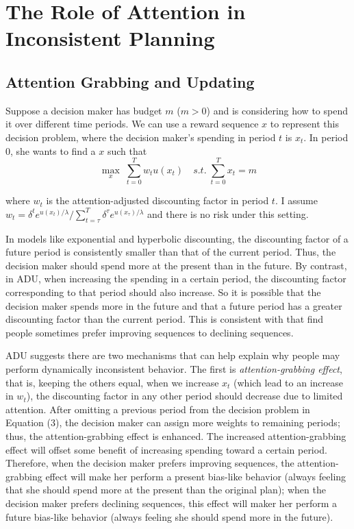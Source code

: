 \documentclass[
  12pt,
]{article}
\begin{document}
\hypertarget{the-role-of-attention-in-inconsistent-planning}{%
\section{The Role of Attention in Inconsistent
Planning}\label{the-role-of-attention-in-inconsistent-planning}}

\hypertarget{attention-grabbing-and-updating}{%
\subsection{Attention Grabbing and
Updating}\label{attention-grabbing-and-updating}}

Suppose a decision maker has budget \(m\) (\(m>0\)) and is considering
how to spend it over different time periods. We can use a reward
sequence \(x\) to represent this decision problem, where the decision
maker's spending in period \(t\) is \(x_t\). In period 0, she wants to
find a \(x\) such
that\[ \tag{3} \max_{x}\;\sum_{t=0}^T w_t u(x_t)\quad s.t. \;\sum_{t=0}^T x_t = m   \]

where \(w_t\) is the attention-adjusted discounting factor in period
\(t\). I assume
\(w_t=\delta^t e^{u(x_t)/\lambda}/\sum_{t=\tau}^T \delta^{\tau} e^{u(x_\tau)/\lambda}\)
and there is no risk under this setting.

In models like exponential and hyperbolic discounting, the discounting
factor of a future period is consistently smaller than that of the
current period. Thus, the decision maker should spend more at the
present than in the future. By contrast, in ADU, when increasing the
spending in a certain period, the discounting factor corresponding to
that period should also increase. So it is possible that the decision
maker spends more in the future and that a future period has a greater
discounting factor than the current period. This is consistent with
\citet{loewenstein_preferences_1993} that find people sometimes prefer
improving sequences to declining sequences.

ADU suggests there are two mechanisms that can help explain why people
may perform dynamically inconsistent behavior. The first is
\emph{attention-grabbing effect}, that is, keeping the others equal,
when we increase \(x_t\) (which lead to an increase in \(w_t\)), the
discounting factor in any other period should decrease due to limited
attention. After omitting a previous period from the decision problem in
Equation (3), the decision maker can assign more weights to remaining
periods; thus, the attention-grabbing effect is enhanced. The increased
attention-grabbing effect will offset some benefit of increasing
spending toward a certain period. Therefore, when the decision maker
prefers improving sequences, the attention-grabbing effect will make her
perform a present bias-like behavior (always feeling that she should
spend more at the present than the original plan); when the decision
maker prefers declining sequences, this effect will maker her perform a
future bias-like behavior (always feeling she should spend more in the
future).
\end{document}

